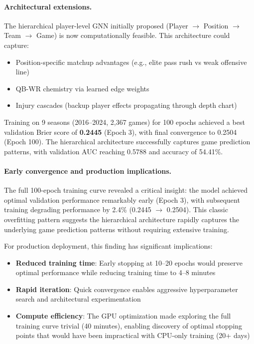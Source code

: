\paragraph{Architectural extensions.} The hierarchical player-level GNN initially proposed (Player $\to$ Position $\to$ Team $\to$ Game) is now computationally feasible. This architecture could capture:
\begin{itemize}
    \item Position-specific matchup advantages (e.g., elite pass rush vs weak offensive line)
    \item QB-WR chemistry via learned edge weights
    \item Injury cascades (backup player effects propagating through depth chart)
\end{itemize}

Training on 9 seasons (2016--2024, 2,367 games) for 100 epochs achieved a best validation Brier score of \textbf{0.2445} (Epoch 3), with final convergence to 0.2504 (Epoch 100). The hierarchical architecture successfully captures game prediction patterns, with validation AUC reaching 0.5788 and accuracy of 54.41\%.

\paragraph{Early convergence and production implications.} The full 100-epoch training curve revealed a critical insight: the model achieved optimal validation performance remarkably early (Epoch 3), with subsequent training degrading performance by 2.4\% (0.2445 $\to$ 0.2504). This classic overfitting pattern suggests the hierarchical architecture rapidly captures the underlying game prediction patterns without requiring extensive training.

For production deployment, this finding has significant implications:
\begin{itemize}
    \item \textbf{Reduced training time}: Early stopping at 10--20 epochs would preserve optimal performance while reducing training time to 4--8 minutes
    \item \textbf{Rapid iteration}: Quick convergence enables aggressive hyperparameter search and architectural experimentation
    \item \textbf{Compute efficiency}: The GPU optimization made exploring the full training curve trivial (40 minutes), enabling discovery of optimal stopping points that would have been impractical with CPU-only training (20+ days)
\end{itemize}

